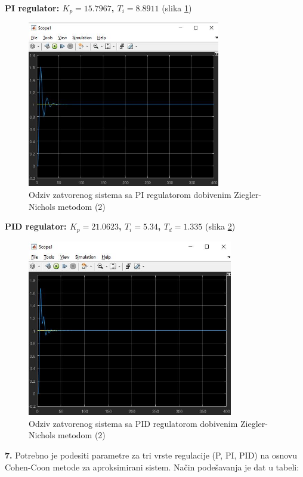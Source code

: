\textbf{PI regulator: $K_p=15.7967$, $T_i=8.8911$} (slika \ref{fig:z1_19})
 
\begin{figure} [H]
  \centering
  \includegraphics[width=0.75\textwidth]{z1_19}
  \caption{Odziv zatvorenog sistema sa PI regulatorom dobivenim Ziegler-Nichols metodom (2)}
  \label{fig:z1_19}
\end{figure} 

\textbf{PID regulator: $K_p=21.0623$, $T_i=5.34$, $T_d=1.335$} (slika \ref{fig:z1_20})

\begin{figure} [H]
  \centering
  \includegraphics[width=0.8\textwidth]{z1_20}
  \caption{Odziv zatvorenog sistema sa PID regulatorom dobivenim Ziegler-Nichols metodom (2)}
  \label{fig:z1_20}
\end{figure}  

\textbf{7.} Potrebno je podesiti parametre za tri vrste regulacije (P, PI, PID) na osnovu Cohen-Coon metode za aproksimirani sistem. Način podešavanja je dat u tabeli:
 
